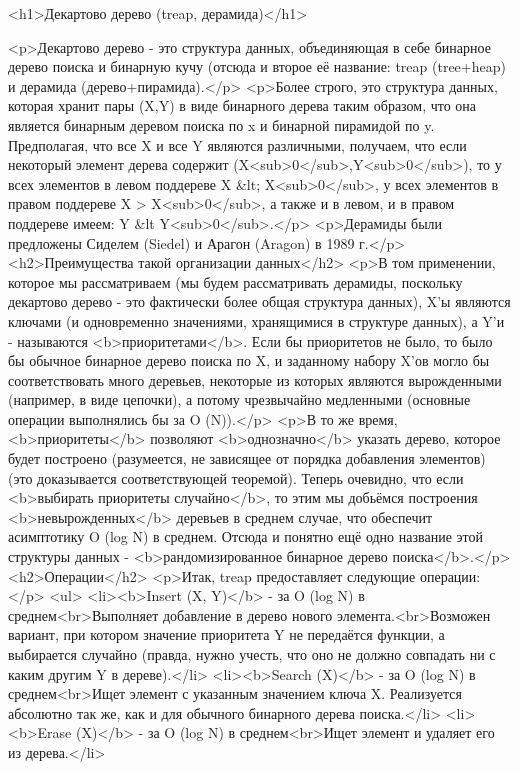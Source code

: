 <h1>Декартово дерево (treap, дерамида)</h1>

<p>Декартово дерево - это структура данных, объединяющая в себе бинарное дерево поиска и бинарную кучу (отсюда и второе её название: treap (tree+heap) и дерамида (дерево+пирамида).</p>
<p>Более строго, это структура данных, которая хранит пары (X,Y) в виде бинарного дерева таким образом, что она является бинарным деревом поиска по x и бинарной пирамидой по y. Предполагая, что все X и все Y являются различными, получаем, что если некоторый элемент дерева содержит (X<sub>0</sub>,Y<sub>0</sub>), то у всех элементов в левом поддереве X &lt; X<sub>0</sub>, у всех элементов в правом поддереве X > X<sub>0</sub>, а также и в левом, и в правом поддереве имеем: Y &lt Y<sub>0</sub>.</p>
<p>Дерамиды были предложены Сиделем (Siedel) и Арагон (Aragon) в 1989 г.</p>
<h2>Преимущества такой организации данных</h2>
<p>В том применении, которое мы рассматриваем (мы будем рассматривать дерамиды, поскольку декартово дерево - это фактически более общая структура данных), X'ы являются ключами (и одновременно значениями, хранящимися в структуре данных), а Y'и - называются <b>приоритетами</b>. Если бы приоритетов не было, то было бы обычное бинарное дерево поиска по X, и заданному набору X'ов могло бы соответствовать много деревьев, некоторые из которых являются вырожденными (например, в виде цепочки), а потому чрезвычайно медленными (основные операции выполнялись бы за O (N)).</p>
<p>В то же время, <b>приоритеты</b> позволяют <b>однозначно</b> указать дерево, которое будет построено (разумеется, не зависящее от порядка добавления элементов) (это доказывается соответствующей теоремой). Теперь очевидно, что если <b>выбирать приоритеты случайно</b>, то этим мы добьёмся построения <b>невырожденных</b> деревьев в среднем случае, что обеспечит асимптотику O (log N) в среднем. Отсюда и понятно ещё одно название этой структуры данных - <b>рандомизированное бинарное дерево поиска</b>.</p>
<h2>Операции</h2>
<p>Итак, treap предоставляет следующие операции:</p>
<ul>
<li><b>Insert (X, Y)</b> - за O (log N) в среднем<br>Выполняет добавление в дерево нового элемента.<br>Возможен вариант, при котором значение приоритета Y не передаётся функции, а выбирается случайно (правда, нужно учесть, что оно не должно совпадать ни с каким другим Y в дереве).</li>
<li><b>Search (X)</b> - за O (log N) в среднем<br>Ищет элемент с указанным значением ключа X. Реализуется абсолютно так же, как и для обычного бинарного дерева поиска.</li>
<li><b>Erase (X)</b> - за O (log N) в среднем<br>Ищет элемент и удаляет его из дерева.</li>
